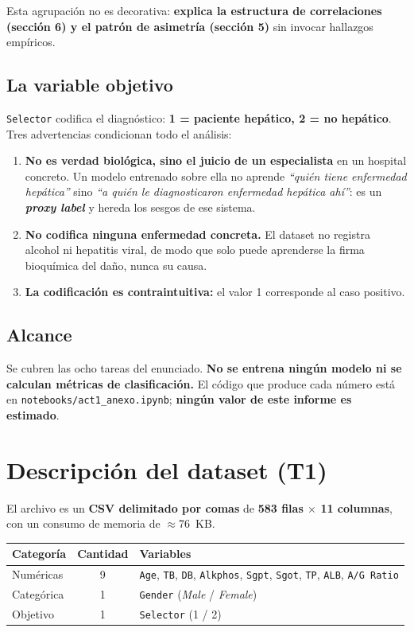 \documentclass[10pt,a4paper]{article}
\begin{document}
Esta agrupación no es decorativa: \textbf{explica la estructura de correlaciones (sección 6) y el patrón de asimetría (sección 5)} sin invocar hallazgos empíricos.

\subsection{La variable objetivo}

\texttt{Selector} codifica el diagnóstico: \textbf{1 = paciente hepático, 2 = no hepático}. Tres advertencias condicionan todo el análisis:

\begin{enumerate}
\item \textbf{No es verdad biológica, sino el juicio de un especialista} en un hospital concreto. Un modelo entrenado sobre ella no aprende \textit{``quién tiene enfermedad hepática''} sino \textit{``a quién le diagnosticaron enfermedad hepática ahí''}: es un \textbf{\textit{proxy label}} y hereda los sesgos de ese sistema.
\item \textbf{No codifica ninguna enfermedad concreta.} El dataset no registra alcohol ni hepatitis viral, de modo que solo puede aprenderse la firma bioquímica del daño, nunca su causa.
\item \textbf{La codificación es contraintuitiva:} el valor 1 corresponde al caso positivo.
\end{enumerate}

\subsection{Alcance}

Se cubren las ocho tareas del enunciado. \textbf{No se entrena ningún modelo ni se calculan métricas de clasificación.} El código que produce cada número está en \texttt{notebooks/act1\_anexo.ipynb}; \textbf{ningún valor de este informe es estimado}.

\section{Descripción del dataset (T1)}

El archivo es un \textbf{CSV delimitado por comas} de \textbf{583 filas $\times$ 11 columnas}, con un consumo de memoria de $\approx$76~KB.

\begin{table}[H]
\footnotesize
\begin{tabularx}{\textwidth}{@{}l c X@{}}
\toprule
\textbf{Categoría} & \textbf{Cantidad} & \textbf{Variables} \\
\midrule
Numéricas & 9 & \texttt{Age}, \texttt{TB}, \texttt{DB}, \texttt{Alkphos}, \texttt{Sgpt}, \texttt{Sgot}, \texttt{TP}, \texttt{ALB}, \texttt{A/G Ratio} \\
Categórica & 1 & \texttt{Gender} (\textit{Male} / \textit{Female}) \\
Objetivo & 1 & \texttt{Selector} (1 / 2) \\
\bottomrule
\end{tabularx}
\end{table}
\end{document}
